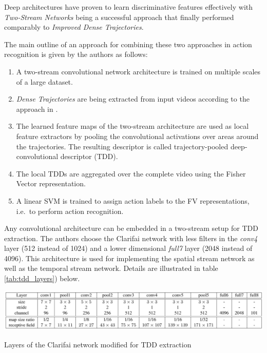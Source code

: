 Deep architectures have proven to learn discriminative features effectively with \textit{Two-Stream Networks} being a successful approach that finally performed comparably to \textit{Improved Dense Trajectories}.

The main outline of an approach for combining these two approaches in action recognition is given by the authors as follows:
\begin{enumerate}
    \item A two-stream convolutional network architecture is trained on multiple scales of a large dataset.
    \item \textit{Dense Trajectories} are being extracted from input videos according to the approach in \cite{wang_action_2013}.  
    \item The learned feature maps of the two-stream architecture are used as local feature extractors by pooling the convolutional activations over areas around the trajectories. The resulting descriptor is called trajectory-pooled deep-convolutional descriptor (TDD).
    \item The local TDDs are aggregated over the complete video using the Fisher Vector representation. \cite{sanchez_image_2013}
    \item A linear SVM is trained to assign action labels to the FV representations, i.e.\ to perform action recognition.
\end{enumerate}



Any convolutional architecture can be embedded in a two-stream setup for TDD extraction.
The authors choose the Clarifai network \cite{zeiler_visualizing_2014-1} with less filters in the \textit{conv4} layer (512 instead of 1024) and a lower dimensional \textit{full7} layer (2048 instead of 4096).
This architecture is used for implementing the spatial stream network as well as the temporal stream network.
Details are illustrated in table \ref{tab:tdd_layers}) below.

\begin{table}[H]
    \centering
    \includegraphics[width=\textwidth]{img_deep/tdd_layers}
    \caption{Layers of the Clarifai network modified for TDD extraction \cite{wang_action_2015}}
    \label{tab:tdd_layers}
\end{table}

